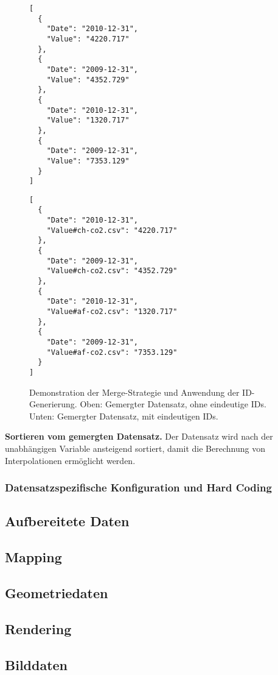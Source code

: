 \begin{figure}[!htbp]
	\centering
	\begin{minipage}{0.40\textwidth}
		\centering
		\begin{verbatim}
[
  {
    "Date": "2010-12-31",
    "Value": "4220.717"
  },
  {
    "Date": "2009-12-31",
    "Value": "4352.729"
  },
  {
    "Date": "2010-12-31",
    "Value": "1320.717"
  },
  {
    "Date": "2009-12-31",
    "Value": "7353.129"
  }
]
		\end{verbatim}
	\end{minipage}\hfill
	\begin{minipage}{0.5\textwidth}
		\centering
		\begin{verbatim}
[
  {
    "Date": "2010-12-31",
    "Value#ch-co2.csv": "4220.717"
  },
  {
    "Date": "2009-12-31",
    "Value#ch-co2.csv": "4352.729"
  },
  {
    "Date": "2010-12-31",
    "Value#af-co2.csv": "1320.717"
  },
  {
    "Date": "2009-12-31",
    "Value#af-co2.csv": "7353.129"
  }
]
		\end{verbatim}
	\end{minipage}
	\caption[Merge-Strategie]{Demonstration der Merge-Strategie und Anwendung der ID-Generierung. Oben: Gemergter Datensatz, ohne eindeutige IDs. Unten: Gemergter Datensatz, mit eindeutigen IDs.}
	\label{fig:merge}
\end{figure}

\textbf{Sortieren vom gemergten Datensatz.} Der Datensatz wird nach der unabhängigen Variable ansteigend sortiert, damit die Berechnung von Interpolationen ermöglicht werden.

\subsubsection{Datensatzspezifische Konfiguration und Hard Coding}

\subsection{Aufbereitete Daten}

\subsection{Mapping}

\subsection{Geometriedaten}

\subsection{Rendering}

\subsection{Bilddaten}